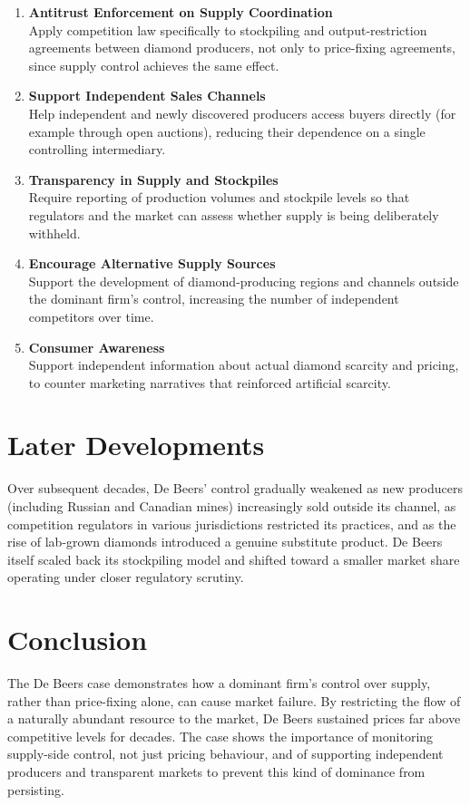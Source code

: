 \begin{enumerate}
  \item \textbf{Antitrust Enforcement on Supply Coordination}\\
  Apply competition law specifically to stockpiling and output-restriction agreements between diamond producers, not only to price-fixing agreements, since supply control achieves the same effect.

  \item \textbf{Support Independent Sales Channels}\\
  Help independent and newly discovered producers access buyers directly (for example through open auctions), reducing their dependence on a single controlling intermediary.

  \item \textbf{Transparency in Supply and Stockpiles}\\
  Require reporting of production volumes and stockpile levels so that regulators and the market can assess whether supply is being deliberately withheld.

  \item \textbf{Encourage Alternative Supply Sources}\\
  Support the development of diamond-producing regions and channels outside the dominant firm's control, increasing the number of independent competitors over time.

  \item \textbf{Consumer Awareness}\\
  Support independent information about actual diamond scarcity and pricing, to counter marketing narratives that reinforced artificial scarcity.
\end{enumerate}

\section{Later Developments}
Over subsequent decades, De Beers' control gradually weakened as new producers (including Russian and Canadian mines) increasingly sold outside its channel, as competition regulators in various jurisdictions restricted its practices, and as the rise of lab-grown diamonds introduced a genuine substitute product. De Beers itself scaled back its stockpiling model and shifted toward a smaller market share operating under closer regulatory scrutiny.

\section{Conclusion}
The De Beers case demonstrates how a dominant firm's control over supply, rather than price-fixing alone, can cause market failure. By restricting the flow of a naturally abundant resource to the market, De Beers sustained prices far above competitive levels for decades. The case shows the importance of monitoring supply-side control, not just pricing behaviour, and of supporting independent producers and transparent markets to prevent this kind of dominance from persisting.

